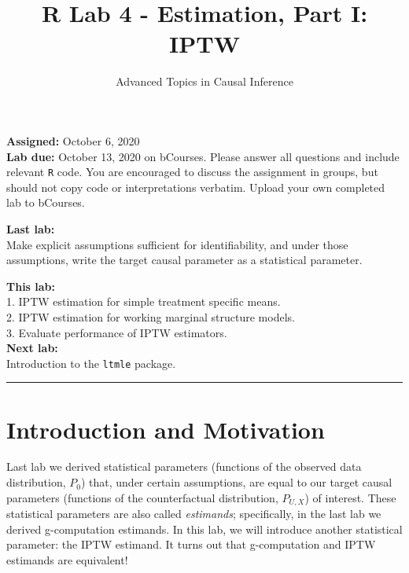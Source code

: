 \documentclass[answers]{exam}
\title{R Lab 4 - Estimation, Part I: IPTW}
\author{Advanced Topics in Causal Inference}
\date{}
\begin{document}
\maketitle



\noindent \textbf{Assigned:} October 6, 2020\\
\textbf{Lab due:} October 13, 2020 on bCourses. Please answer all questions and include relevant \texttt{R} code. You are encouraged to discuss the assignment in groups, but should not copy code or interpretations verbatim. Upload your own completed lab to bCourses.

\noindent \textbf{Last lab:} \\
Make explicit assumptions sufficient for identifiability, and under those assumptions, write the target causal parameter as a statistical parameter.


\noindent \textbf{This lab:}\\
1. IPTW estimation for simple treatment specific means. \\
2. IPTW estimation for working marginal structure models. \\
3. Evaluate performance of IPTW estimators. \\

\noindent \textbf{Next lab:}\\
Introduction to the \texttt{ltmle} package.



\begin{center}
\noindent\rule{18cm}{0.4pt}
\end{center}


\section{Introduction and Motivation}

Last lab we derived statistical parameters (functions of the observed data distribution, $P_0$) that, under certain assumptions, are equal to our target causal parameters (functions of the counterfactual distribution, $P_{U,X}$) of interest. These statistical parameters are also called \textit{estimands}; specifically, in the last lab we derived g-computation estimands. In this lab, we will introduce another statistical parameter: the IPTW estimand. It turns out that g-computation and IPTW estimands are equivalent! %
\end{document}
